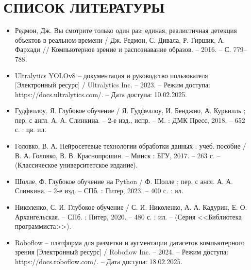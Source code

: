 \sectionbreak \section*{ 
    \gostTitleFont
    \redline
    СПИСОК ЛИТЕРАТУРЫ
}
\titlespace

{\gostFont

\begin{itemize}[leftmargin=2.15cm, labelwidth=0.65cm, labelsep=0.0cm] 

    \item[\theimagecntr.] Редмон, Дж. Вы смотрите только один раз: единая, реалистичная детекция объектов в реальном времени / Дж. Редмон, С. Дивала, Р. Гиршик, А. Фархади // Компьютерное зрение и распознавание образов. {--} 2016. {--} С. 779–788.
    \addtocounter{imagecntr}{1}

    \item[\theimagecntr.] Ultralytics YOLOv8 {--} документация и руководство пользователя [Электронный ресурс] / Ultralytics Inc. {--} 2023. {--} Режим доступа: https://docs.ultralytics.com/. {--} Дата доступа: 10.02.2025.
    \addtocounter{imagecntr}{1}

    \item[\theimagecntr.] Гудфеллоу, Я. Глубокое обучение / Я. Гудфеллоу, И. Бенджио, А. Курвилль ; пер. с англ. А. А. Слинкина. {--} 2-е изд., испр. {--} М. : ДМК Пресс, 2018. {--} 652 с. : цв. ил.
    \addtocounter{imagecntr}{1}

    \item[\theimagecntr.] Головко, В. А. Нейросетевые технологии обработки данных : учеб. пособие / В. А. Головко, В. В. Краснопрошин. {--} Минск : БГУ, 2017. {--} 263 с. {--} (Классическое университетское издание).
    \addtocounter{imagecntr}{1}

    \item[\theimagecntr.] Шолле, Ф. Глубокое обучение на Python / Ф. Шолле ; пер. с англ. А. А. Слинкина. {--} 2-е изд. {--} СПб. : Питер, 2023. {--} 400 с. : ил.
    \addtocounter{imagecntr}{1}

    \item[\theimagecntr.] Николенко, С. И. Глубокое обучение / С. И. Николенко, А. А. Кадурин, Е. О. Архангельская. {--} СПб. : Питер, 2020. {--} 480 с. : ил. {--} (Серия <<Библиотека программиста>>).
    \addtocounter{imagecntr}{1}

    \item[\theimagecntr.] Roboflow {--} платформа для разметки и аугментации датасетов компьютерного зрения [Электронный ресурс] / Roboflow Inc. {--} 2024. {--} Режим доступа: \\ https://docs.roboflow.com/. {--} Дата доступа: 18.02.2025.
    \addtocounter{imagecntr}{1}


\end{itemize}}
